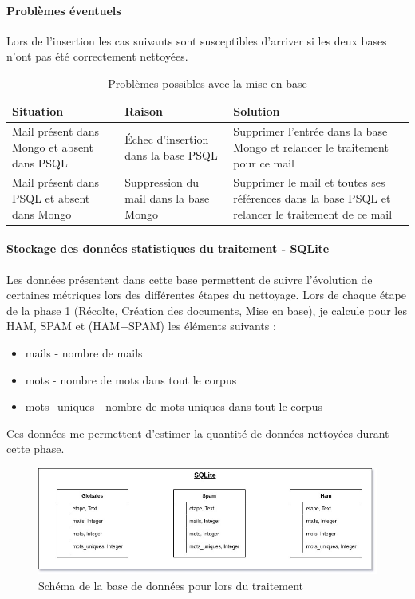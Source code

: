     \paragraph{Problèmes éventuels}
        Lors de l'insertion les cas suivants sont susceptibles d'arriver si les deux bases n'ont pas été correctement nettoyées.\\
        \begin{table}[H]
            \begin{tabular}{|p{4cm}|p{4cm}|p{7cm}|}
                \hline
                Situation & Raison & Solution\\
                \hline
                Mail présent dans Mongo et absent dans PSQL & Échec d'insertion dans la base PSQL & Supprimer l'entrée dans la base Mongo et relancer le traitement pour ce mail\\
                \hline
                Mail présent dans PSQL et absent dans Mongo & Suppression du mail dans la base Mongo & Supprimer le mail et toutes ses références dans la base PSQL et relancer le traitement de ce mail\\
                \hline
            \end{tabular}
            \caption{Problèmes possibles avec la mise en base}
            \label{tab:pb-base}
        \end{table}


    \paragraph{Stockage des données statistiques du traitement - SQLite}
        Les données présentent dans cette base permettent de suivre l'évolution de certaines métriques lors des différentes étapes du nettoyage.
        Lors de chaque étape de la phase 1 (Récolte, Création des documents, Mise en base), je calcule pour les HAM, SPAM et (HAM+SPAM) les éléments suivants :
        \begin{itemize}
            \item mails - nombre de mails
            \item mots - nombre de mots dans tout le corpus
            \item mots\_uniques - nombre de mots uniques dans tout le corpus
        \end{itemize}

        Ces données me permettent d'estimer la quantité de données nettoyées durant cette phase.

        \begin{figure}[H]
            \includegraphics[width=\linewidth]{img/Schemasqlite}
            \caption{Schéma de la base de données pour lors du traitement}
            \label{fig:sqlite_schema}
        \end{figure}

